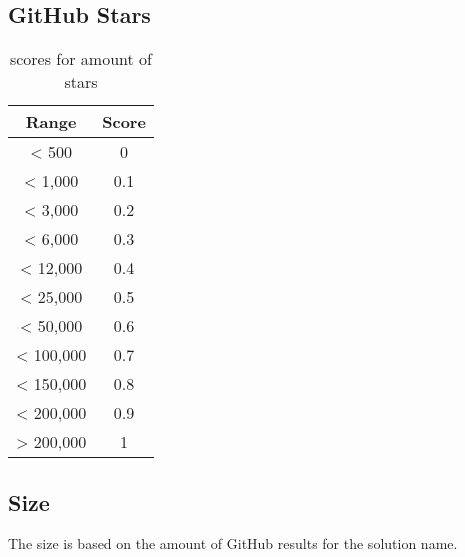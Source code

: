 \subsection{GitHub Stars}
\begin{table}[H]
    \centering
    \begin{tabular}{|c|c|}
        \hline
        \textbf{Range} & \textbf{Score} \\
        \hline
        < 500          & 0              \\ \hline
        < 1,000        & 0.1            \\ \hline
        < 3,000        & 0.2            \\ \hline
        < 6,000        & 0.3            \\ \hline
        < 12,000       & 0.4            \\ \hline
        < 25,000       & 0.5            \\ \hline
        < 50,000       & 0.6            \\ \hline
        < 100,000      & 0.7            \\ \hline
        < 150,000      & 0.8            \\ \hline
        < 200,000      & 0.9            \\ \hline
        > 200,000      & 1              \\ \hline
    \end{tabular}
    \caption{scores for amount of stars}
    \label{tab:metrics:stars}
\end{table}

\subsection{Size}
\label{app:metrics:ecosystem:size}

The size is based on the amount of GitHub results for the solution name.

